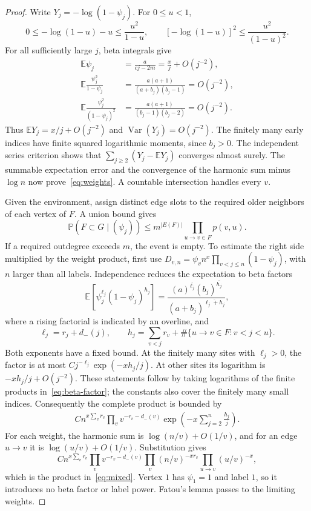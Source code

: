 \documentclass[11pt]{article}
\theoremstyle{remark}\newtheorem{remark}[theorem]{Remark}
\DeclareMathOperator{\Var}{Var}
\newcommand{\E}{\mathbb E}
\newcommand{\Prob}{\mathbb P}
\newcommand{\rise}[2]{(#1)^{\overline{#2}}}
\begin{document}
\begin{proof}
Write $Y_j=-\log(1-\psi_j)$. For $0\le u<1$,
\[
 0\le-\log(1-u)-u\le\frac{u^2}{1-u},\qquad
 [-\log(1-u)]^2\le\frac{u^2}{(1-u)^2}.
\]
For all sufficiently large $j$, beta integrals give
\begin{align*}
 \E\psi_j&=\frac{a}{cj-2m}=\frac{x}{j}+O(j^{-2}),\\
 \E\frac{\psi_j^2}{1-\psi_j}
 &=\frac{a(a+1)}{(a+b_j)(b_j-1)}=O(j^{-2}),\\
 \E\frac{\psi_j^2}{(1-\psi_j)^2}
 &=\frac{a(a+1)}{(b_j-1)(b_j-2)}=O(j^{-2}).
\end{align*}
Thus $\E Y_j=x/j+O(j^{-2})$ and $\Var(Y_j)=O(j^{-2})$.
The finitely many early indices have finite squared logarithmic moments,
since $b_j>0$. The independent series criterion
\cite[Theorem~2.5.6]{durrett} shows that
$\sum_{j\ge2}(Y_j-\E Y_j)$ converges almost surely.
The summable expectation error and the convergence of the harmonic sum
minus $\log n$ now prove~\eqref{eq:weights}. A countable intersection
handles every $v$.

Given the environment, assign distinct edge slots to the required older
neighbors of each vertex of $F$. A union bound gives
\begin{equation}\label{eq:edge-bound}
 \Prob(F\subset G\mid(\psi_j))
 \le m^{|E(F)|}\prod_{u\to v\in F}p(v,u).
\end{equation}
If a required outdegree exceeds $m$, the event is empty. To estimate the
right side multiplied by the weight product, first use
$D_{v,n}=\psi_v n^x\prod_{v<j\le n}(1-\psi_j)$, with $n$ larger than
all labels. Independence reduces the expectation to beta factors
\begin{equation}\label{eq:beta-factor}
 \E[\psi_j^{\ell_j}(1-\psi_j)^{h_j}]
 =\frac{\rise{a}{\ell_j}\rise{b_j}{h_j}}
 {\rise{a+b_j}{\ell_j+h_j}},
\end{equation}
where a rising factorial is indicated by an overline, and
\[
 \ell_j=r_j+d_-(j),\qquad
 h_j=\sum_{v<j}r_v+\#\{u\to v\in F:v<j<u\}.
\]
Both exponents have a fixed bound. At the finitely many sites with
$\ell_j>0$, the factor is at most
$Cj^{-\ell_j}\exp(-xh_j/j)$. At other sites its logarithm is
$-xh_j/j+O(j^{-2})$. These statements follow by taking logarithms of the
finite products in~\eqref{eq:beta-factor}; the constants also cover the
finitely many small indices. Consequently the complete product is bounded by
\begin{align*}
 Cn^{x\sum_vr_v}\prod_vv^{-r_v-d_-(v)}
 \exp\left(-x\sum_{j=2}^n\frac{h_j}{j}\right).
\end{align*}
For each weight, the harmonic sum is $\log(n/v)+O(1/v)$, and for an edge
$u\to v$ it is $\log(u/v)+O(1/v)$. Substitution gives
\[
 Cn^{x\sum_vr_v}\prod_vv^{-r_v-d_-(v)}
 \prod_v(n/v)^{-xr_v}\prod_{u\to v}(u/v)^{-x},
\]
which is the product in~\eqref{eq:mixed}. Vertex $1$ has $\psi_1=1$ and
label $1$, so it introduces no beta factor or label power.
Fatou's lemma passes to the limiting weights.


\end{proof}
\end{document}

